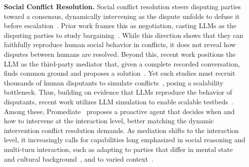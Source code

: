 \documentclass{llmxive}
\begin{document}
\noindent\textbf{{Social Conflict Resolution.}}
Social conflict resolution steers disputing parties toward a consensus, dynamically intervening as the dispute unfolds to defuse it before escalation~\citep{deutsch2011handbook}. Prior work frames this as negotiation, casting LLMs as the disputing parties to study bargaining~\citep{bianchi2024well, zhou2024sotopia, kwon2024llms}. While this direction shows that they can faithfully reproduce human social behavior in conflicts, it does not reveal how disputes between humans are resolved.
%
Beyond this, recent work positions the LLM as the third-party mediator that, given a complete recorded conversation, finds common ground and proposes a solution~\citep{tan2024robots, tessler2024habermas}. Yet such studies must recruit thousands of human disputants to simulate conflicts~\citep{chawla2021casino, hale2025kodis, tessler2024habermas}, posing a scalability bottleneck. 
%
Thus, building on evidence that LLMs reproduce the behavior of disputants, recent work utilizes LLM simulation to enable scalable testbeds~\citep{chen2026simulating}. Among these, Promediate~\citep{liu2025promediate} proposes a proactive agent that decides when and how to intervene at the interaction level, better matching the dynamic intervention conflict resolution demands. As mediation shifts to the interaction level, it increasingly calls for capabilities long emphasized in social reasoning and multi-turn interaction, such as adapting to parties that differ in mental state~\citep{xiao2025towards} and cultural background~\citep{ki2025multiple}, and to varied context~\citep{shapira2024clever}.

\end{document}
